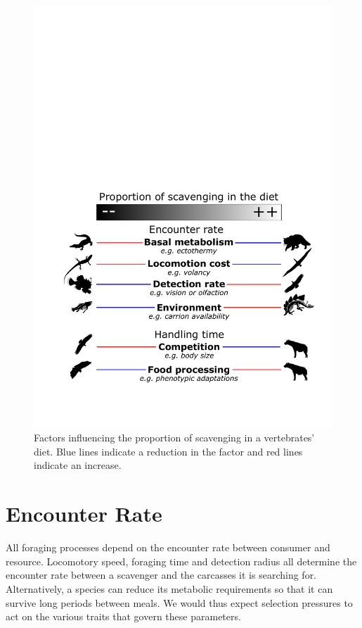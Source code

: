 \documentclass[a4paper,12pt]{article}
\begin{document}
\begin{figure}[!htbp]
\centering
   \includegraphics[width=1\textwidth]{Summary_figure/Summary_figure.pdf}
\caption{Factors influencing the proportion of scavenging in a vertebrates' diet. Blue lines indicate a reduction in the factor and red lines indicate an increase.}
\label{Summary_figure}
\end{figure}


\section*{Encounter Rate}
All foraging processes depend on the encounter rate between consumer and resource. 
Locomotory speed, foraging time and detection radius all determine the encounter rate between a scavenger and the carcasses it is searching for. 
Alternatively, a species can reduce its metabolic requirements so that it can survive long periods between meals. 
We would thus expect selection pressures to act on the various traits that govern these parameters.  
\end{document}

